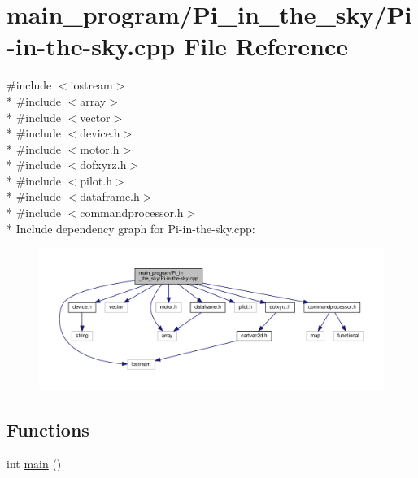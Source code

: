 \hypertarget{_pi__in__the__sky_2_pi-in-the-sky_8cpp}{}\section{main\+\_\+program/\+Pi\+\_\+in\+\_\+the\+\_\+sky/\+Pi-\/in-\/the-\/sky.cpp File Reference}
\label{_pi__in__the__sky_2_pi-in-the-sky_8cpp}
{\ttfamily \#include $<$iostream$>$}\\*
{\ttfamily \#include $<$array$>$}\\*
{\ttfamily \#include $<$vector$>$}\\*
{\ttfamily \#include $<$device.\+h$>$}\\*
{\ttfamily \#include $<$motor.\+h$>$}\\*
{\ttfamily \#include $<$dofxyrz.\+h$>$}\\*
{\ttfamily \#include $<$pilot.\+h$>$}\\*
{\ttfamily \#include $<$dataframe.\+h$>$}\\*
{\ttfamily \#include $<$commandprocessor.\+h$>$}\\*
Include dependency graph for Pi-\/in-\/the-\/sky.cpp\+:\nopagebreak
\begin{figure}[H]
\begin{center}
\leavevmode
\includegraphics[width=350pt]{_pi__in__the__sky_2_pi-in-the-sky_8cpp__incl}
\end{center}
\end{figure}
\subsection*{Functions}
\begin{DoxyCompactItemize}
\item 
int \hyperlink{_pi__in__the__sky_2_pi-in-the-sky_8cpp_ae66f6b31b5ad750f1fe042a706a4e3d4}{main} ()
\end{DoxyCompactItemize}

